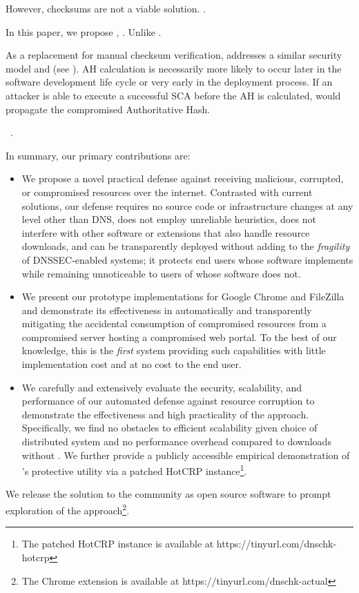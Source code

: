 However, checksums are not a viable solution. .

In this paper, we propose \SYSTEM{}, . Unlike .

As a replacement for manual checksum verification, \SYSTEM{} addresses a similar
security model and   (see ). AH calculation is necessarily more
likely to occur later in the software development life cycle or very early in
the deployment process. If an attacker is able to execute a successful SCA
before the AH is calculated, \SYSTEM{} would propagate the compromised
Authoritative Hash.

~\cite{DNSSEC}.


In summary, our primary contributions are:

\begin{itemize}

  \item We propose a novel practical defense against receiving malicious,
  corrupted, or compromised resources over the internet. Contrasted with current
  solutions, our defense requires no source code or infrastructure changes at
  any level other than DNS, does not employ unreliable heuristics, does not
  interfere with other software or extensions that also handle resource
  downloads, and can be transparently deployed without adding to the
  \textit{fragility} of DNSSEC-enabled systems; it protects end users whose
  software implements \SYSTEM{} while remaining unnoticeable to users of whose
  software does not.

  \item We present our prototype \SYSTEM{} implementations for Google Chrome and
  FileZilla and demonstrate its effectiveness in automatically and transparently
  mitigating the accidental consumption of compromised resources from a
  compromised server hosting a compromised web portal. To the best of our
  knowledge, this is the \emph{first} system providing such capabilities with
  little implementation cost and at no cost to the end user.

  \item We carefully and extensively evaluate the security, scalability, and
  performance of our automated defense against resource corruption to
  demonstrate the effectiveness and high practicality of the \SYSTEM{} approach.
  Specifically, we find no obstacles to efficient scalability given choice of
  distributed system and no performance overhead compared to downloads without
  \SYSTEM{}. We further provide a publicly accessible empirical demonstration of
  \SYSTEM{}'s protective utility via a patched HotCRP instance\footnote{The
  patched HotCRP instance is available at https://tinyurl.com/dnschk-hotcrp}.

\end{itemize}

We release the \SYSTEM{} solution to the community as open source software to
prompt exploration of the \SYSTEM{} approach\footnote{The \SYSTEM{} Chrome
extension is available at https://tinyurl.com/dnschk-actual}.
